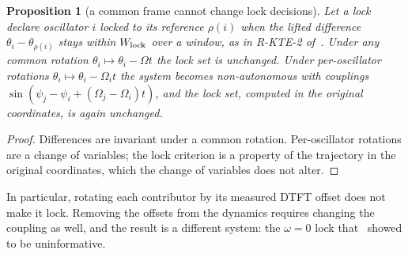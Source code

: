\documentclass[10pt]{article}
\newtheorem{prop}[thm]{Proposition}
\theoremstyle{definition}
\begin{document}
\begin{prop}[a common frame cannot change lock decisions]\label{p:frame}
Let a lock declare oscillator $i$ locked to its reference $\rho(i)$ when the lifted difference $\theta_i-\theta_{\rho(i)}$ stays within $W_{\rm lock}$ over a window, as in R-KTE-2 of~\cite{dtft}. Under any common rotation $\theta_i\mapsto\theta_i-\Omega t$ the lock set is unchanged. Under per-oscillator rotations $\theta_i\mapsto\theta_i-\Omega_it$ the system becomes non-autonomous with couplings $\sin(\psi_j-\psi_i+(\Omega_j-\Omega_i)t)$, and the lock set, computed in the original coordinates, is again unchanged.
\end{prop}
\begin{proof}
Differences are invariant under a common rotation. Per-oscillator rotations are a change of variables; the lock criterion is a property of the trajectory in the original coordinates, which the change of variables does not alter.
\end{proof}
\noindent In particular, rotating each contributor by its measured DTFT offset does not make it lock. Removing the offsets from the dynamics requires changing the coupling as well, and the result is a different system: the $\omega=0$ lock that~\cite{dtft} showed to be uninformative.
\end{document}
